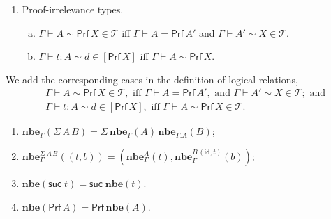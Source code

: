 \documentclass{LMCS}
\theoremstyle{plain}\newtheorem{satz}[thm]{Satz}
\def\cf{{\em cf.}}
\newcommand{\LONGVERSION}[1]{#1}
\newcommand{\SHORTVERSION}[1]{}
\newcommand{\ctxe}[2]{#1.#2}
\newcommand{\idsubs}[1]{\mathsf{id}_{#1}}
\newcommand{\exsubs}[2]{( #1, #2)}
\newcommand{\subsTy}[2]{#1\,#2}
\newcommand{\DSum}[2]{\Sigma\,#1\,#2}
\newcommand{\depair}[2]{(#1,#2)}
\newcommand{\suctm}[1]{\mathsf{suc}\;#1}
\newcommand{\boxty}[1]{[#1]}
\newcommand{\subid}[2]{\exsubs{\idsubs{#1}}{#2}}
\newcommand{\dtype}[2]{#1\vdash#2}
\newcommand{\dterm}[3]{#1\vdash#3:#2}
\newcommand{\deqtype}[3]{#1\vdash#2=#3}
\newcommand{\perT}{\mathcal{T}}
\newcommand{\rel}{\sim}
\newcommand{\nbe}[1]{\mathbf{nbe}(#1)}
\newcommand{\nbety}[2]{\mathbf{nbe}_{#1}(#2)}
\newcommand{\nbetm}[3]{\mathbf{nbe}_{#1}^{#2}(#3)}
\renewcommand{\boxty}[1]{\mathsf{Prf}\,#1}
\newcommand{\prf}[1]{\mathsf{Prf}\,#1}
\newcommand{\LONGVERSION}[1]{}
\newcommand{\SHORTVERSION}[1]{#1}
\newcommand{\LONGSHORT}[2]{\LONGVERSION{#1}\SHORTVERSION{#2}}
\begin{document}
{\begin{defi}[\cf\ \ref{def:logrel}]
\begin{enumerate}[(1)]
  \item Proof-irrelevance types.
    \begin{enumerate}[(a)]
    \item $\dtype{\Gamma}{A}\rel \prf{X}\in \perT$ iff
      $\deqtype{\Gamma}{A}{\boxty{A'}}$ and $\dtype{\Gamma}{A'}\rel
      X\in \perT$.
    \item $\dterm{\Gamma}{A}{t}\rel d \in [\prf{X}]$ iff
      $\dtype{\Gamma}{A}\rel \prf{X}$.
    \end{enumerate}
  \end{enumerate}
\end{defi}
}{
  We add the corresponding cases in the definition of logical relations,
  \begin{align*}
    &\dtype{\Gamma}{A}\rel \prf{X}\in \perT , \mbox{ iff }
    \deqtype{\Gamma}{A}{\boxty{A'}} , \mbox{ and }\dtype{\Gamma}{A'}\rel
    X\in \perT ; \mbox{ and}\\
  &\dterm{\Gamma}{A}{t}\rel d \in [\prf{X}], \mbox{ iff }
    \dtype{\Gamma}{A}\rel \prf{X} \in \perT .
  \end{align*}
}



\LONGSHORT{
  






















  \begin{rem}\hfill
    \begin{enumerate}[(1)]
    \item $\nbety{\Gamma}{\DSum{A}{B}}=\DSum{\nbety{\Gamma}{A}}{\nbety{\ctxe{\Gamma}{A}}{B}}$;
    \item $\nbetm{\Gamma}{\DSum{A}{B}}{\depair{t}{b}}=\depair{\nbetm{\Gamma}{A}{t}}
      {\nbetm{\Gamma}{\subsTy{B}{\subid{}{t}}}{b}}$;
    \item $\nbe{\suctm{t}} = \suctm{\nbe{t}}$.
    \item $\nbe{\boxty{A}} = \boxty{\nbe{A}}$.
    \end{enumerate}
  \end{rem}
}{
  \begin{rem}
    All the lemmata \ref{lem:logrelEqTy}, \ref{lem:logrelMon},
    \ref{lem:logrelEqD}, \ref{lem:judgeq}, theorem \ref{thm:logrel},
    and remarks \ref{rem:nbe-eq}, \ref{rem:nbe-hom} are still
    valid. Moreover we also have $\nbe{\boxty{A}} = \boxty{(\nbe{A})}$.
  \end{rem}
}
\end{document}

